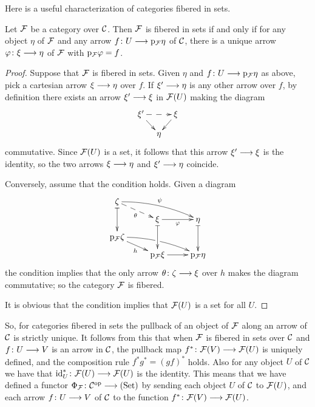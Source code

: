 \begin{3   FIBERED CATEGORIES}
\begin{3.4 Functors and cats fibered in sets}
Here is a useful characterization of categories fibered in sets.

\begin{proposition}%
\label{prop:characterization-fibered-sets}
Let $\mathcal{F}$ be a category over $\mathcal{C}$. Then $\mathcal{F}$ is fibered in sets if and only if for any object $\eta$ of $\mathcal{F}$ and any arrow $f \colon U \arr  \p_{\cF} \eta$ of $\mathcal{C}$, there is a unique arrow $\phi\colon \xi \arr \eta$ of $\mathcal{F}$ with $\mathrm{p}_{\mathcal{F}} \varphi = f$.
\end{proposition}

\begin{proof} Suppose that $\mathcal{F}$ is fibered in sets. Given $\eta$ and $f \colon U \arr \p_{\cF} \eta$ as above, pick a cartesian arrow $\xi \arr \eta$ over $f$. If $\xi' \arr \eta$ is any other arrow over $f$, by definition there exists an arrow $\xi' \arr \xi$ in $\mathcal{F}(U)$ making the diagram 
   \[
   \xymatrix@-15pt{{}\xi' \ar@{-->}[rr]\ar[rd] && {}\xi\ar[ld]\\
             & {}\eta \\}
   \]
commutative. Since $\mathcal{F}(U)$ is a set, it follows that this arrow $\xi' \arr \xi$ is the identity, so the two arrows $\xi\arr \eta$ and $\xi' \arr \eta$ coincide.

Conversely, assume that the condition holds. Given a diagram
   \[
   \xymatrix@R=6pt{{\zeta}\ar@{|->}[dd] \ar@{-->}[rd]_\theta
   \ar@/^/[rrd]^{\psi} \\
   & {}\xi\ar@{|->}[dd]\ar[r]_{\phi}
   &{}\eta\ar@{|->}[dd] \\
   {}\p_{\cF} \zeta\ar[rd]_h\ar@/^/[rrd]|(.487)\hole\\
   & {}\p_{\cF} \xi \ar[r]
   & {}\p_{\cF} \eta
   }
   \]
the condition implies that the only arrow $\theta\colon \zeta \arr \xi$ over $h$ makes the diagram commutative; so the category $\mathcal{F}$ is fibered.

It is obvious that the condition implies that $\mathcal{F}(U)$ is a set for all $U$.
\end{proof}


So, for categories fibered in sets the pullback of an object of $\mathcal{F}$ along an arrow of $\mathcal{C}$ is strictly unique. It follows from this that when $\mathcal{F}$ is fibered in sets over $\mathcal{C}$ and $f \colon U \arr V$ is an arrow in $\mathcal{C}$, the pullback map $f^* \colon \cF(V) \arr \cF(U)$ is uniquely defined, and the composition rule $f^*g^* = (gf)^*$ holds.  Also for any object $U$ of $\mathcal{C}$ we have that $\id_U^* \colon \cF(U) \arr \cF(U)$ is the identity. This means that we have defined a functor $\Phi_\cF \colon \cC\op \arr \catset$ by sending each object $U$ of $\mathcal{C}$ to $\mathcal{F}(U)$, and each arrow $f \colon U \arr V$ of $\mathcal{C}$ to the function $f^* \colon \cF(V) \arr \cF(U)$.


\end{3.4 Functors and cats fibered in sets}
\end{3   FIBERED CATEGORIES}
